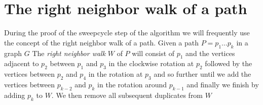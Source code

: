 




\section{The right neighbor walk of a path}
  \label{s:rightNeighbour}

  During the proof of the sweepcycle step of the algorithm we will frequently use the concept of the right neighbor walk of a path.
  Given a path $P = p_1 \ldots p_k$ in a graph $G$
  The \emph{right neighbor walk} $W$ of $P$ will consist of $p_1$ and the vertices adjacent to $p_{2}$ between $p_1$ and $p_{3}$ in the clockwise rotation at $p_{2}$ followed by the vertices between $p_{2}$ and $p_{4}$ in the rotation at $p_{3}$ and so further until we add the vertices between $p_{k-2}$ and $p_k$ in the rotation around $p_{k-1}$ and finally we finish by adding $p_k$ to $W$.
  We then remove all subsequent duplicates from $W$

